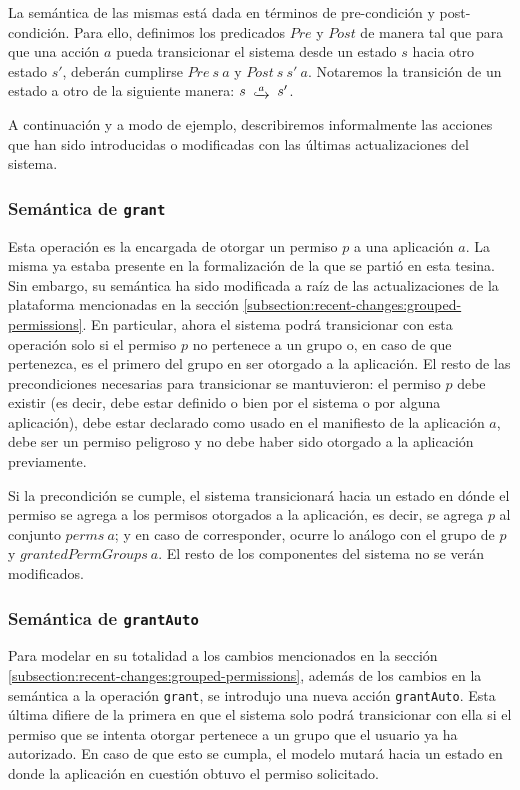 La semántica de las mismas está dada en términos de pre-condición y post-condición. Para ello,
definimos los predicados $Pre$ y $Post$ de manera tal que para que una acción $a$ pueda transicionar
el sistema desde un estado $s$ hacia otro estado $s'$, deberán cumplirse $Pre\ s\ a$ y $Post\ s\ s'\
a$. Notaremos la transición de un estado a otro de la siguiente manera: $s\ \step{a}\ s'$.

A continuación y a modo de ejemplo, describiremos informalmente las acciones que han sido introducidas
o modificadas con las últimas actualizaciones del sistema.

\subsubsection{Semántica de \texttt{grant}}

Esta operación es la encargada de otorgar un permiso $p$ a una aplicación $a$. La misma ya estaba
presente en la formalización de la que se partió en esta tesina. Sin embargo, su semántica ha sido
modificada a raíz de las actualizaciones de la plataforma mencionadas en la sección
\ref{subsection:recent-changes:grouped-permissions}. En particular, ahora el sistema podrá
transicionar con esta operación solo si  el permiso $p$ no pertenece a un grupo o, en caso de que
pertenezca, es el primero del grupo en ser otorgado a la aplicación. El resto de las precondiciones
necesarias para transicionar se mantuvieron: el permiso $p$ debe existir (es decir, debe estar
definido o bien por el sistema o por alguna aplicación), debe estar declarado como usado en el
manifiesto de la aplicación $a$, debe ser un permiso peligroso y no debe haber sido otorgado a la
aplicación previamente.

Si la precondición se cumple, el sistema transicionará hacia un estado en dónde el permiso se agrega a
los permisos otorgados a la aplicación, es decir, se agrega $p$ al conjunto $perms\ a$; y en caso de
corresponder, ocurre lo análogo con el grupo de $p$ y $grantedPermGroups\ a$. El resto de los
componentes del sistema no se verán modificados.

\subsubsection{Semántica de \texttt{grantAuto}}

Para modelar en su totalidad a los cambios mencionados en la sección
\ref{subsection:recent-changes:grouped-permissions}, además de los cambios en la semántica a la
operación \texttt{grant}, se introdujo una nueva acción \texttt{grantAuto}. Esta última difiere de la
primera en que el sistema solo podrá transicionar con ella si el permiso que se intenta otorgar
pertenece a un grupo que el usuario ya ha autorizado. En caso de que esto se cumpla, el modelo mutará
hacia un estado en donde la aplicación en cuestión obtuvo el permiso solicitado.

